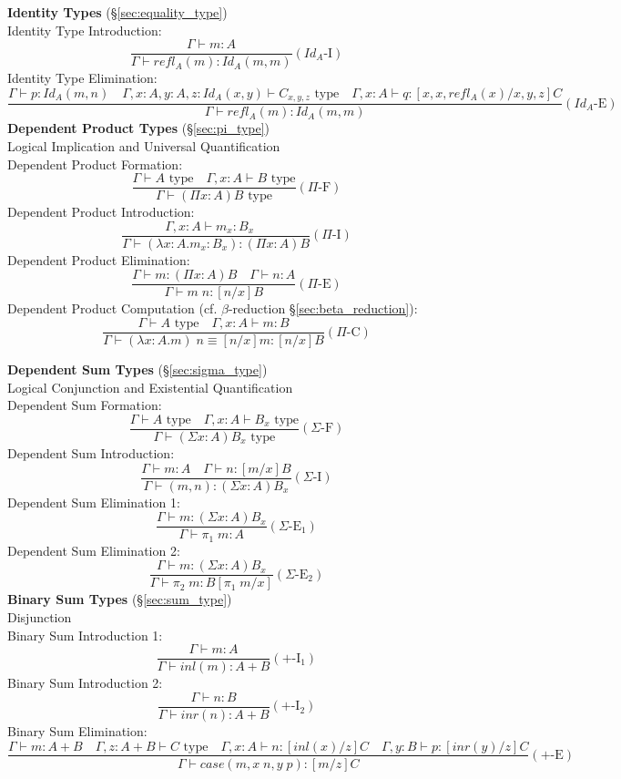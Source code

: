 \textbf{Identity Types} (\S\ref{sec:equality_type})
\\
Identity Type Introduction:
\[
  \frac{
    \Gamma \vdash m : A
  }{
    \Gamma \vdash refl_A(m) : Id_A(m,m)
  } (Id_A\text{-I})
\]
Identity Type Elimination:
\[
  \frac{
    \Gamma \vdash p : Id_A (m,n) \quad
    \Gamma, x:A, y:A, z : Id_A(x,y) \vdash C_{x,y,z} \text{ type}\quad
    \Gamma, x : A \vdash q : [x, x, refl_A(x)/x,y,z]C
  }{
    \Gamma \vdash refl_A(m) : Id_A(m,m)
  } (Id_A\text{-E})
\]
\textbf{Dependent Product Types} (\S\ref{sec:pi_type})
\\
Logical Implication and Universal Quantification
\\
Dependent Product Formation:
\[
  \frac{
    \Gamma \vdash A \text{ type} \quad
    \Gamma, x:A \vdash B \text{ type}
  }{
    \Gamma \vdash (\Pi x:A) B \text{ type}
  } (\Pi\text{-F})
\]
Dependent Product Introduction:
\[
  \frac{
    \Gamma, x : A \vdash m_x : B_x \quad
  }{
    \Gamma \vdash (\lambda x:A.m_x : B_x) : (\Pi x:A) B
  } (\Pi\text{-I})
\]
Dependent Product Elimination:
\[
  \frac{
    \Gamma \vdash m : (\Pi x:A) B \quad
    \Gamma \vdash n : A
  }{
    \Gamma \vdash m\;n : [n/x]B
  } (\Pi\text{-E})
\]
Dependent Product Computation (cf. $\beta$-reduction
\S\ref{sec:beta_reduction}):
\[
  \frac{
    \Gamma \vdash A \text{ type} \quad
    \Gamma , x : A \vdash m : B
  }{
    \Gamma \vdash (\lambda x : A.m)\;n \equiv [n/x]m : [n/x]B
  } (\Pi\text{-C})
\]


\textbf{Dependent Sum Types} (\S\ref{sec:sigma_type})
\\
Logical Conjunction and Existential Quantification
\\
Dependent Sum Formation:
\[
  \frac{
    \Gamma \vdash A \text{ type} \quad
    \Gamma, x : A \vdash B_x \text{ type}
  }{
    \Gamma \vdash (\Sigma x:A) B_x \text{ type}
  } (\Sigma\text{-F})
\]
Dependent Sum Introduction:
\[
  \frac{
    \Gamma \vdash m : A \quad
    \Gamma \vdash n : [m/x]B
  }{
    \Gamma \vdash (m,n) : (\Sigma x:A) B_x
  } (\Sigma\text{-I})
\]
Dependent Sum Elimination 1:
\[
  \frac{
    \Gamma \vdash m : (\Sigma x:A) B_x
  }{
    \Gamma \vdash \pi_1\;m : A
  } (\Sigma\text{-E$_1$})
\]
Dependent Sum Elimination 2:
\[
  \frac{
    \Gamma \vdash m : (\Sigma x:A) B_x
  }{
    \Gamma \vdash \pi_2\;m : B[\pi_1\;m/x]
  } (\Sigma\text{-E$_2$})
\]
\textbf{Binary Sum Types} (\S\ref{sec:sum_type})
\\
Disjunction
\\
Binary Sum Introduction 1:
\[
  \frac{
    \Gamma \vdash m : A
  }{
    \Gamma \vdash inl(m) : A + B
  } (+\text{-I}_1)
\]
Binary Sum Introduction 2:
\[
  \frac{
    \Gamma \vdash n : B
  }{
    \Gamma \vdash inr(n) : A + B
  } (+\text{-I}_2)
\]
Binary Sum Elimination:
\[
  \frac{
    \Gamma \vdash m : A + B \quad
    \Gamma, z : A + B \vdash C \text{ type} \quad
    \Gamma, x : A \vdash n : [inl(x)/z]C \quad
    \Gamma, y : B \vdash p : [inr(y)/z]C
  }{
    \Gamma \vdash case (m, x\;n, y\;p) : [m/z]C
  } (+\text{-E})
\]




